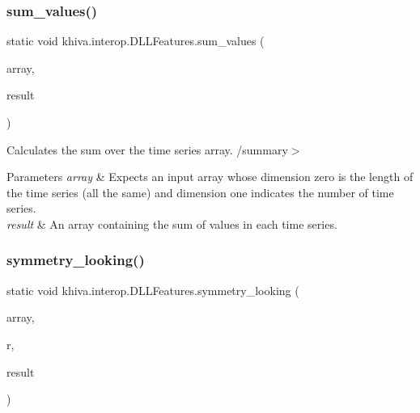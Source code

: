 \subsubsection{\texorpdfstring{sum\+\_\+values()}{sum\_values()}}
{\footnotesize\ttfamily static void khiva.\+interop.\+D\+L\+L\+Features.\+sum\+\_\+values (\begin{DoxyParamCaption}\item[{\mbox{[}\+In\mbox{]} ref Int\+Ptr}]{array,  }\item[{\mbox{[}\+Out\mbox{]} out Int\+Ptr}]{result }\end{DoxyParamCaption})\hspace{0.3cm}{\ttfamily [static]}}



Calculates the sum over the time series array. /summary$>$ 
\begin{DoxyParams}{Parameters}
{\em array} & Expects an input array whose dimension zero is the length of the time series (all the same) and dimension one indicates the number of time series.\\
\hline
{\em result} & An array containing the sum of values in each time series.\\
\hline
\end{DoxyParams}


\mbox{\label{classkhiva_1_1interop_1_1_d_l_l_features_acc4cc0b5e5c243f87a555a56e2dde286}} 
\subsubsection{\texorpdfstring{symmetry\+\_\+looking()}{symmetry\_looking()}}
{\footnotesize\ttfamily static void khiva.\+interop.\+D\+L\+L\+Features.\+symmetry\+\_\+looking (\begin{DoxyParamCaption}\item[{\mbox{[}\+In\mbox{]} ref Int\+Ptr}]{array,  }\item[{\mbox{[}\+In\mbox{]} ref float}]{r,  }\item[{\mbox{[}\+Out\mbox{]} out Int\+Ptr}]{result }\end{DoxyParamCaption})\hspace{0.3cm}{\ttfamily [static]}}




